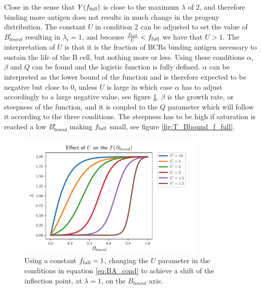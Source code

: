 Close in the sense that $Y(f_{\text{full}})$ is close to the maximum $\lambda$ of 2, and therefore binding more antigen does not results in much change in the progeny distribution.
The constant $U$ in condition 2 can be adjusted to set the value of $B^i_{bound}$ resulting in $\lambda_i = 1$, and because $\frac{f_{\text{full}}}{U} < f_{\text{full}}$ we have that $U > 1$.
The interpretation of $U$ is that it is the fraction of BCRs binding antigen necessary to sustain the life of the B cell, but nothing more or less.
Using these conditions $\alpha$, $\beta$ and $Q$ can be found and the logistic function is fully defined.
$\alpha$ can be interpreted as the lower bound of the function and is therefore expected to be negative but close to 0, unless $U$ is large in which case $\alpha$ has to adjust accordingly to a large negative value, see figure \ref{fig:T_Bbound_U}.
$\beta$ is the growth rate, or steepness of the function, and it is coupled to the $Q$ parameter which will follow it according to the three conditions.
The steepness has to be high if saturation is reached a low $B^i_{bound}$ making $f_{\text{full}}$ small, see figure \ref{fig:T_Bbound_f_full}.
\vfill

\begin{figure}
    \centering
    \includegraphics[width=0.8\textwidth]{figures/T_Bbound_U.pdf}
    \caption{
        \label{fig:T_Bbound_U}
        Using a constant $f_{\text{full}} = 1$, changing the $U$ parameter in the conditions in equation \ref{eq:BA_cond} to achieve a shift of the inflection point, at $\lambda=1$, on the $B_{bound}$ axis.
    }
\end{figure}

